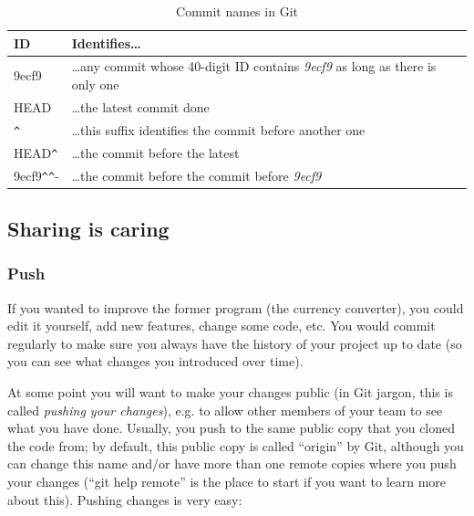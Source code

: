 \begin{table}[hbtp]
  \centering
  \begin{tabular}{p{2cm}p{8cm}}
    ID & Identifies\ldots \\
    \hline
    9ecf9 & \ldots any commit whose 40-digit ID contains \emph{9ecf9}
    as long as there is only one \\
    HEAD & \ldots the latest commit done \\
    \verb+^+ & \ldots this suffix identifies the commit before another one \\ 
    HEAD\verb-^- & \ldots the commit before the latest \\
    9ecf9\verb-^^- & \ldots the commit before the commit before \emph{9ecf9} \\
  \end{tabular}
  \caption{Commit names in Git}
  \label{tab:tagnames}
\end{table}

\subsection{Sharing is caring}
\label{sec:sharing-caring}

\subsubsection{Push}
\label{sec:push}

If you wanted to improve the former program (the currency converter), 
you could edit it yourself, add
new features, change some code, etc. You would commit regularly to
make sure you always have the history of your project up to date (so
you can see what changes you introduced over time).

At some point you will want to make your changes public (in Git
jargon, this is called \emph{pushing your changes}), e.g. to allow
other members of your team to see what you have done. 
Usually, you push to the same public copy that you cloned the code
from; by default, this public copy is called ``origin'' by Git,
although you can change this name and/or have more than one remote
copies where you push your changes (``git help remote'' is the place
to start if you want to learn more about this). Pushing changes is
very easy: 

